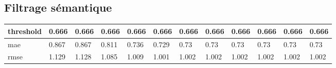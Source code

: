 \begin{appendices}
\subsection*{Filtrage sémantique}
\begin{center}\label{tab21}
	\begin{tabularx}{\textwidth}{|l|X|X|X|X|X|X|X|X|X|X|X|}
		\hline
		threshold & 0.666 & 0.666 & 0.666 & 0.666 & 0.666 & 0.666 & 0.666 & 0.666 & 0.666 & 0.666 & 0.666 \\ \hline
		mae & 0.867 & 0.867 & 0.811 & 0.736 & 0.729 & 0.73 & 0.73 & 0.73 & 0.73 & 0.73 & 0.73 \\ \hline
		rmse & 1.129 & 1.128 & 1.085 & 1.009 & 1.001 & 1.002 & 1.002 & 1.002 & 1.002 & 1.002 & 1.002 \\ \hline
	\end{tabularx}	
\end{center}


\end{appendices}
